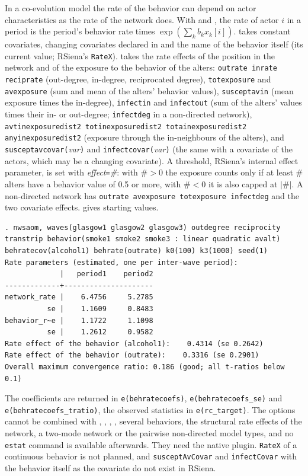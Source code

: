 In a co-evolution model the rate of the behavior can depend on actor characteristics as the rate of the network does. With  and , the rate of actor $i$ in a period is the period's behavior rate times $\exp(\sum_k b_k x_k[i])$.  takes constant covariates, changing covariates declared in  and the name of the behavior itself (its current value; RSiena's \texttt{RateX}).  takes the rate effects of the position in the network and of the exposure to the behavior of the alters: \texttt{outrate inrate reciprate} (out-degree, in-degree, reciprocated degree), \texttt{totexposure} and \texttt{avexposure} (sum and mean of the alters' behavior values), \texttt{susceptavin} (mean exposure times the in-degree), \texttt{infectin} and \texttt{infectout} (sum of the alters' values times their in- or out-degree; \texttt{infectdeg} in a non-directed network), \texttt{avtinexposuredist2 totinexposuredist2 totainexposuredist2 anyinexposuredist2} (exposure through the in-neighbours of the alters), and \texttt{susceptavcovar(}\emph{var}\texttt{)} and \texttt{infectcovar(}\emph{var}\texttt{)} (the same with a covariate of the actors, which may be a changing covariate). A threshold, RSiena's internal effect parameter, is set with \emph{effect}\texttt{=}\emph{\#}: with $\#>0$ the exposure counts only if at least $\#$ alters have a behavior value of 0.5 or more, with $\#<0$ it is also capped at $|\#|$. A non-directed network has \texttt{outrate avexposure totexposure infectdeg} and the two covariate effects.  gives starting values.
\begin{lstlisting}
. nwsaom, waves(glasgow1 glasgow2 glasgow3) outdegree reciprocity transtrip behavior(smoke1 smoke2 smoke3 : linear quadratic avalt) behratecov(alcohol1) behrate(outrate) k0(100) k3(1000) seed(1)
Rate parameters (estimated, one per inter-wave period):
             |   period1    period2 
-------------+---------------------
network_rate |    6.4756     5.2785 
          se |    1.1609     0.8483 
behavior_r~e |    1.1722     1.1098 
          se |    1.2612     0.9582 
Rate effect of the behavior (alcohol1):    0.4314 (se 0.2642)
Rate effect of the behavior (outrate):    0.3316 (se 0.2901)
Overall maximum convergence ratio: 0.186 (good; all t-ratios below 0.1)
\end{lstlisting}
The coefficients are returned in \texttt{e(behratecoefs)}, \texttt{e(behratecoefs\_se)} and \texttt{e(behratecoefs\_tratio)}, the observed statistics in \texttt{e(rc\_target)}. The options cannot be combined with , , , , several behaviors, the structural rate effects of the network, a two-mode network or the pairwise non-directed model types, and no \texttt{estat} command is available afterwards. They need the native plugin. \texttt{RateX} of a continuous behavior is not planned, and \texttt{susceptAvCovar} and \texttt{infectCovar} with the behavior itself as the covariate do not exist in RSiena.

